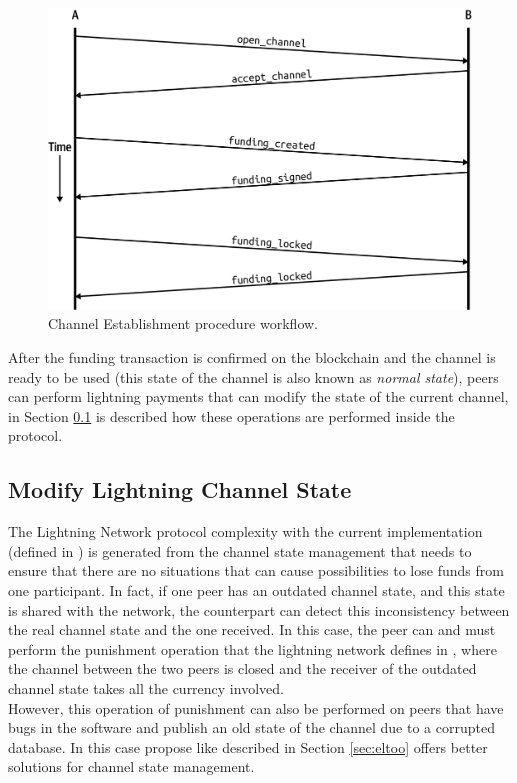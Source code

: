 \begin{figure}[h]
  \begin{center}
  \includegraphics[width=0.6\columnwidth]{imgs/mtln_0703.png}
  \end{center}
  \caption{Channel Establishment procedure workflow.}
  \label{fig:channel-establishment}
\end{figure}

After the funding transaction is confirmed on the blockchain and the channel is ready to be used (this state of the channel is also known as \emph{normal state}),
peers can perform lightning payments that can modify the state of the current channel, in Section \ref{sec:modify_channel_state} is described how
these operations are performed inside the protocol.

\subsection{Modify Lightning Channel State}
\label{sec:modify_channel_state}


The Lightning Network protocol complexity with the current implementation (defined in \cite{lightning-bolts})
is generated from the channel state management that needs to ensure that there are no situations that can
cause  possibilities to lose funds from one participant.
In fact, if one peer has an outdated channel state, and this state is shared with the network, the counterpart can
detect this inconsistency between the real channel state and the one received. In this case, the peer can and must
perform the punishment operation that the lightning network defines in \cite{bolt2}, where the channel between the two peers
is closed and the receiver of the outdated channel state takes all the currency involved.\\
However, this operation of punishment can also be performed on peers that have bugs in the software and publish an old state of the
channel due to a corrupted database. In this case propose like \cite{eltoo} described in Section \ref{sec:eltoo} offers
better solutions for channel state management.

